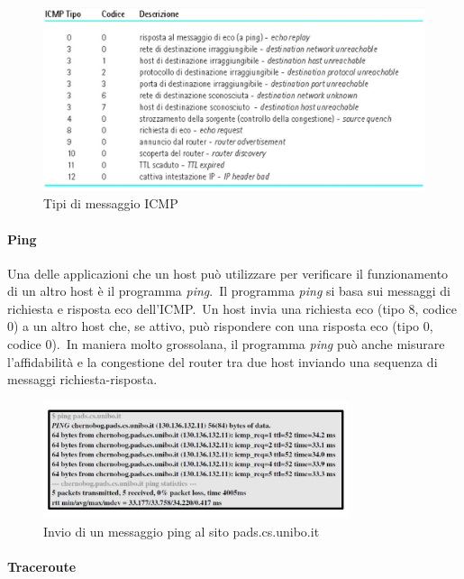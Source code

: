 \begin{figure}[H]
    \centering
    \includegraphics[width=\textwidth]{immagini/Tipi_ICMP.jpg}
    \caption*{Tipi di messaggio ICMP}
\end{figure}

\paragraph{Ping}

Una delle applicazioni che un host può utilizzare per verificare il funzionamento di un altro host è il programma \emph{ping}.\
Il programma \emph{ping} si basa sui messaggi di richiesta e risposta eco dell'ICMP.\
Un host invia una richiesta eco (tipo 8, codice 0) a un altro host che, se attivo, può rispondere con una risposta eco (tipo 0, codice 0).\
In maniera molto grossolana, il programma \emph{ping} può anche misurare l'affidabilità e la congestione del router tra due host inviando una sequenza di messaggi richiesta-risposta.

\begin{figure}[H]
    \centering
    \includegraphics[width=0.8\textwidth]{immagini/Ping.jpg}
    \caption*{Invio di un messaggio ping al sito pads.cs.unibo.it}
\end{figure}

\paragraph{Traceroute}

